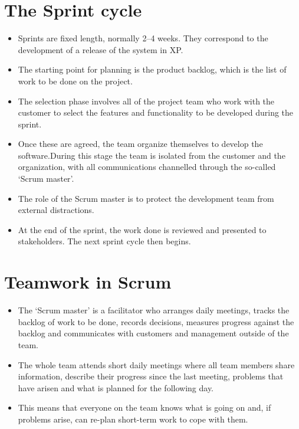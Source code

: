 \section{ The Sprint cycle}
\begin{itemize}

\item Sprints are fixed length, normally 2–4 weeks. They correspond to the development of a release of the system in XP.

\item The starting point for planning is the product backlog, which is the list of work to be done on the project.

\item The selection phase involves all of the project team who work with the customer to select the features and functionality to be developed during the sprint.


\item Once these are agreed, the team organize themselves to develop the software.During this stage the team is isolated from the customer and the organization, with all communications channelled through the so-called ‘Scrum master’.

\item The role of the Scrum master is to protect the development team from external distractions.

\item At the end of the sprint, the work done is reviewed and presented to stakeholders. The next sprint cycle then begins.


\end{itemize}
\section{ Teamwork in Scrum}
\begin{itemize}

\item The ‘Scrum master’ is a facilitator who arranges daily meetings, tracks the backlog of work to be done, records decisions, measures progress against the backlog and communicates with customers and management outside of the team.

\item The whole team attends short daily meetings where all team members share information, describe their progress since the last meeting, problems that have arisen and what is planned for the following day.

\item This means that everyone on the team knows what is going on and, if problems arise, can re-plan short-term work to cope with them.

\end{itemize}
